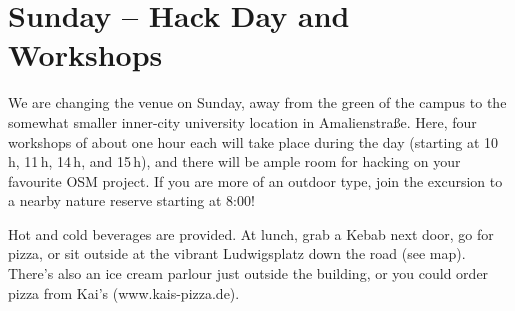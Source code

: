 \ClearWallPaper

\cropmarkswallpaper

\newpage
{}
\thispagestyle{empty}
\section*{Sunday -- Hack Day and Workshops}
\label{sunday}

We are changing the venue on Sunday, away from the green of
the campus to the somewhat smaller inner-city university
location in Amalienstraße. Here, 
four workshops of about
one hour each will take place during the day (starting at 10\,h,
11\,h, 14\,h, and 15\,h), and there will be ample room for
hacking on your favourite OSM project. If you are more of an
outdoor type, join the excursion to a nearby nature reserve
starting at 8:00!

Hot and cold beverages are provided. At lunch, 
grab a Kebab next door, go for pizza, or sit outside at
the vibrant Ludwigsplatz down the road (see map). There's also an ice cream parlour just outside the
building, or you could order pizza from Kai's (www.kais-pizza.de).
\cropmarkswallpaper
